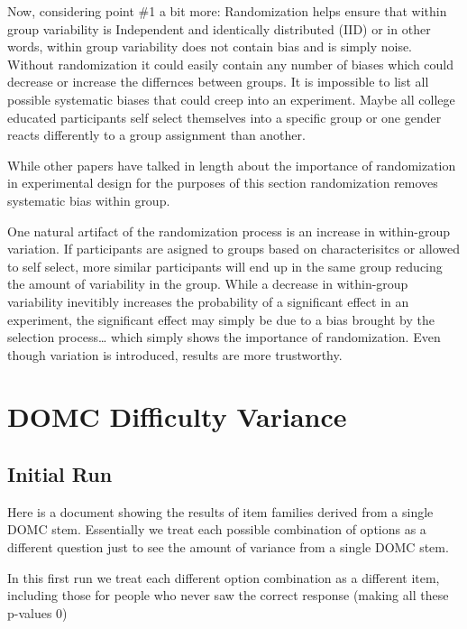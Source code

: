 \documentclass[]{book}
\theoremstyle{definition}
\theoremstyle{definition}
\theoremstyle{definition}
\theoremstyle{remark}
\begin{document}
Now, considering point \#1 a bit more: Randomization helps ensure that
within group variability is Independent and identically distributed
(IID) or in other words, within group variability does not contain bias
and is simply noise. Without randomization it could easily contain any
number of biases which could decrease or increase the differnces between
groups. It is impossible to list all possible systematic biases that
could creep into an experiment. Maybe all college educated participants
self select themselves into a specific group or one gender reacts
differently to a group assignment than another.

While other papers have talked in length about the importance of
randomization in experimental design for the purposes of this section
randomization removes systematic bias within group.

One natural artifact of the randomization process is an increase in
within-group variation. If participants are asigned to groups based on
characterisitcs or allowed to self select, more similar participants
will end up in the same group reducing the amount of variability in the
group. While a decrease in within-group variability inevitibly increases
the probability of a significant effect in an experiment, the
significant effect may simply be due to a bias brought by the selection
process\ldots{} which simply shows the importance of randomization. Even
though variation is introduced, results are more trustworthy.

\chapter{DOMC Difficulty Variance}\label{domc-difficulty-variance}

\section{Initial Run}\label{initial-run}

Here is a document showing the results of item families derived from a
single DOMC stem. Essentially we treat each possible combination of
options as a different question just to see the amount of variance from
a single DOMC stem.

In this first run we treat each different option combination as a
different item, including those for people who never saw the correct
response (making all these p-values 0)
\end{document}
